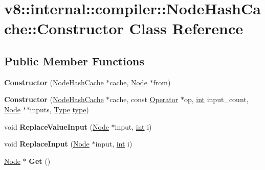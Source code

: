 \hypertarget{classv8_1_1internal_1_1compiler_1_1NodeHashCache_1_1Constructor}{}\section{v8\+:\+:internal\+:\+:compiler\+:\+:Node\+Hash\+Cache\+:\+:Constructor Class Reference}
\label{classv8_1_1internal_1_1compiler_1_1NodeHashCache_1_1Constructor}
\subsection*{Public Member Functions}
\begin{DoxyCompactItemize}
\item 
\mbox{\label{classv8_1_1internal_1_1compiler_1_1NodeHashCache_1_1Constructor_a3d3a403f4bbf15b40b1a5b9cc143eba8}} 
{\bfseries Constructor} (\mbox{\hyperlink{classv8_1_1internal_1_1compiler_1_1NodeHashCache}{Node\+Hash\+Cache}} $\ast$cache, \mbox{\hyperlink{classv8_1_1internal_1_1compiler_1_1Node}{Node}} $\ast$from)
\item 
\mbox{\label{classv8_1_1internal_1_1compiler_1_1NodeHashCache_1_1Constructor_aa5a78805160f459778ef9ed155f81c63}} 
{\bfseries Constructor} (\mbox{\hyperlink{classv8_1_1internal_1_1compiler_1_1NodeHashCache}{Node\+Hash\+Cache}} $\ast$cache, const \mbox{\hyperlink{classv8_1_1internal_1_1compiler_1_1Operator}{Operator}} $\ast$op, \mbox{\hyperlink{classint}{int}} input\+\_\+count, \mbox{\hyperlink{classv8_1_1internal_1_1compiler_1_1Node}{Node}} $\ast$$\ast$inputs, \mbox{\hyperlink{classv8_1_1internal_1_1compiler_1_1Type}{Type}} \mbox{\hyperlink{classstd_1_1conditional_1_1type}{type}})
\item 
\mbox{\label{classv8_1_1internal_1_1compiler_1_1NodeHashCache_1_1Constructor_a9a4ca29fc0d8f9628e14e9e8bfede223}} 
void {\bfseries Replace\+Value\+Input} (\mbox{\hyperlink{classv8_1_1internal_1_1compiler_1_1Node}{Node}} $\ast$input, \mbox{\hyperlink{classint}{int}} i)
\item 
\mbox{\label{classv8_1_1internal_1_1compiler_1_1NodeHashCache_1_1Constructor_abbde0cd2647993cbfc58c8d01e83769c}} 
void {\bfseries Replace\+Input} (\mbox{\hyperlink{classv8_1_1internal_1_1compiler_1_1Node}{Node}} $\ast$input, \mbox{\hyperlink{classint}{int}} i)
\item 
\mbox{\label{classv8_1_1internal_1_1compiler_1_1NodeHashCache_1_1Constructor_a0e219fb327f90c607ee2ffa40c355f6c}} 
\mbox{\hyperlink{classv8_1_1internal_1_1compiler_1_1Node}{Node}} $\ast$ {\bfseries Get} ()
\end{DoxyCompactItemize}


